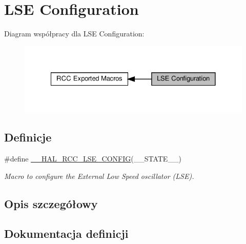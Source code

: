\hypertarget{group___r_c_c___l_s_e___configuration}{}\section{L\+SE Configuration}
\label{group___r_c_c___l_s_e___configuration}
Diagram współpracy dla L\+SE Configuration\+:\nopagebreak
\begin{figure}[H]
\begin{center}
\leavevmode
\includegraphics[width=328pt]{group___r_c_c___l_s_e___configuration}
\end{center}
\end{figure}
\subsection*{Definicje}
\begin{DoxyCompactItemize}
\item 
\#define \hyperlink{group___r_c_c___l_s_e___configuration_ga6b2b48f429e347c1c9c469122c64798b}{\+\_\+\+\_\+\+H\+A\+L\+\_\+\+R\+C\+C\+\_\+\+L\+S\+E\+\_\+\+C\+O\+N\+F\+IG}(\+\_\+\+\_\+\+S\+T\+A\+T\+E\+\_\+\+\_\+)
\begin{DoxyCompactList}\small\item\em Macro to configure the External Low Speed oscillator (L\+SE). \end{DoxyCompactList}\end{DoxyCompactItemize}


\subsection{Opis szczegółowy}


\subsection{Dokumentacja definicji}
\mbox{\label{group___r_c_c___l_s_e___configuration_ga6b2b48f429e347c1c9c469122c64798b}} 
